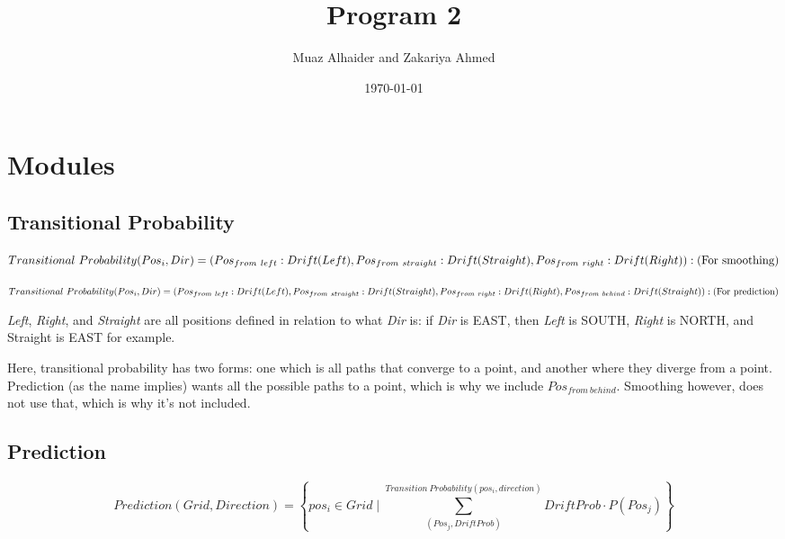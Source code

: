 \documentclass[11pt]{article}
\author{Muaz Alhaider and Zakariya Ahmed}
\date{\today}
\title{Program 2}
\begin{document}
\maketitle

\section*{Modules}
\label{sec:orgeb98485}

\subsection*{Transitional Probability}
\label{sec:org7d7cbf4}
   \begin{math}
    Transitional\ Probability(Pos_i, Dir) = \\
     (Pos_{from\ left}:Drift(Left), Pos_{from\ straight}:Drift(Straight), Pos_{from\ right}:Drift(Right)): (\text{For smoothing})
\end{math}

\newline
\begin{math}
\\ \\
Transitional\ Probability(Pos_i, Dir) =\\ (Pos_{from\ left}:Drift(Left), Pos_{from\ straight}:Drift(Straight), Pos_{from\ right}:Drift(Right), Pos_{from\ behind}:Drift(Straight)): (\text{For prediction})
\\ \\
\end{math}


\emph{Left}, \emph{Right}, and \emph{Straight} are all positions defined in relation to what \emph{Dir} is: if \emph{Dir} is EAST, then \emph{Left} is SOUTH, \emph{Right} is NORTH, and Straight is EAST for example.

Here, transitional probability has two forms: one which is all paths that converge to a point, and another where they diverge from a point. Prediction (as the name implies) wants all the possible paths to a point, which is why we include \(Pos_{from\ behind}\). Smoothing however, does not use that, which is why it's not included.


\subsection*{Prediction}
\label{sec:org59a7289}
$$Prediction(Grid, Direction) = \left\{pos_i \in Grid \mid \sum_{(Pos_j, DriftProb)}^{Transition\ Probability(pos_i, direction)} DriftProb \cdot P(Pos_j) \right \}$$
\end{document}
